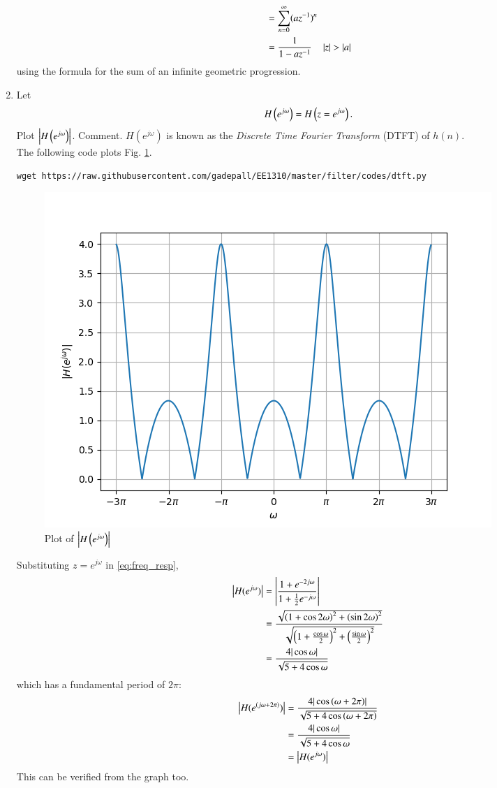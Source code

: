 \documentclass[journal,12pt,twocolumn]{IEEEtran}
\theoremstyle{remark}
\renewcommand\thesection{\arabic{section}}
\numberwithin{equation}{subsection}
\begin{document}
\begin{enumerate}[label=\thesection.\arabic*]
\begin{align}
    &= \sum_{n=0}^{\infty}(az^{-1})^n\\
    &= \frac{1}{1 - az^{-1}} \quad \left\vert z\right\vert > \left\vert a\right\vert
\end{align}
using the formula for the sum of an infinite geometric progression.
\item 
Let
\begin{equation}
H\left(e^{j \omega}\right) = H\left(z = e^{j \omega}\right).
\end{equation}
Plot $\left\vert H\left(e^{j \omega}\right)\right\vert$.  Comment.  $H(e^{j \omega})$ is
known as the {\em Discrete Time Fourier Transform} (DTFT) of $h(n)$.
\\
\solution The following code plots Fig. \ref{fig:dtft}.
\begin{lstlisting}
wget https://raw.githubusercontent.com/gadepall/EE1310/master/filter/codes/dtft.py
\end{lstlisting}
\begin{figure}[!h]
\centering
\includegraphics[width=\columnwidth]{figs/4.5.png}
\caption{Plot of $\left\vert H\left(e^{j\omega}\right)\right\vert$}
\label{fig:dtft}
\end{figure}

Substituting $z = e^{j \omega}$ in \eqref{eq:freq_resp},
\begin{align}
    \left\vert H(e^{j\omega})\right\vert &= \left\vert\frac{1 + e^{-2j\omega}}{1 + \frac{1}{2}e^{-j\omega}}\right\vert\\
    &= \frac{\sqrt{\left(1 + \cos{2\omega}\right)^2 + \left(\sin{2\omega}\right)^2}}{\sqrt{\left(1 + \frac{\cos{\omega}}{2}\right)^2 + \left(\frac{\sin{\omega}}{2}\right)^2}}\\
    &= \frac{4|\cos{\omega}|}{\sqrt{5 + 4\cos{\omega}}}
\end{align}
which has a fundamental period of $2\pi$:
\begin{align}
    \left\vert H(e^{\left(j\omega + 2\pi\right)})\right\vert &= \frac{4|\cos{\ensuremath{\left(\omega + 2\pi\right)}}|}{\sqrt{5 + 4\cos{\ensuremath{\left(\omega + 2\pi\right)}}}}\\
    &= \frac{4|\cos{\omega}|}{\sqrt{5 + 4\cos{\omega}}}\\
    &= \left\vert H(e^{j\omega})\right\vert
\end{align}
This can be verified from the graph too.


\end{enumerate}
\end{document}
